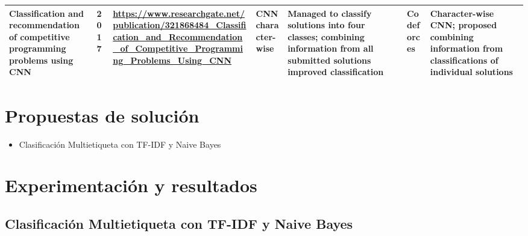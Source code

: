 \documentclass{article}
\begin{document}
\begin{itemize}
\begin{longtable}{|p{2cm}|p{0.8cm}|p{2cm}|p{2cm}|p{3cm}|p{2cm}|p{3cm}|}
              \hline
              Classification and recommendation of competitive programming problems
              using CNN
                             & 2017
                             & \href{https://www.researchgate.net/publication/321868484_Classification_and_Recommendation_of_Competitive_Programming_Problems_Using_CNN}{\url{https://www.researchgate.net/publication/321868484_Classification_and_Recommendation_of_Competitive_Programming_Problems_Using_CNN}}

              
              
              
              
              
                             & CNN character-wise 
                             & Managed to classify solutions into four classes; combining information from all submitted solutions improved classification 
                             & Codeforces 
                             & Character-wise CNN; proposed combining information from classifications of individual solutions                                                                                                                                                                                                                                                                                                        \\
              
              \hline
              
          \end{longtable}
          
          
\end{itemize}

\section{Propuestas de solución}
\begin{itemize}
    \item Clasificación Multietiqueta con TF-IDF y Naive Bayes
\end{itemize}

\section{Experimentación y resultados}

\subsection{Clasificación Multietiqueta con TF-IDF y Naive Bayes}
\end{document}
